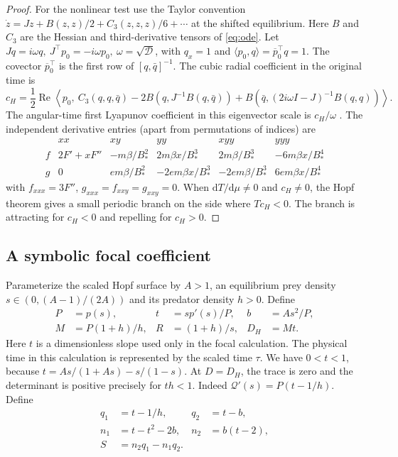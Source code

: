 \documentclass[12pt,a4paper,twoside,fleqn]{article}
\theoremstyle{journal}
\newcommand{\dd}{\mathrm{d}}
\newcommand{\Real}{\operatorname{Re}}
\newcommand{\Q}{\mathcal Q}
\newcommand{\Det}{\mathcal D}
\begin{document}
\begin{proof}
For the nonlinear test use the Taylor convention \(\dot z=Jz+B(z,z)/2+C_3(z,z,z)/6+\cdots\) at the shifted equilibrium. Here \(B\) and \(C_3\) are the Hessian and third-derivative tensors of \eqref{eq:ode}. Let \(Jq=i\omega q,\ J^\top p_0=-i\omega p_0,\ \omega=\sqrt{\Det}\), with \(q_x=1\) and \(\langle p_0,q\rangle=\overline p_0^\top q=1\). The covector \(\overline p_0^\top\) is the first row of \([q,\bar q]^{-1}\). The cubic radial coefficient in the original time is
\begin{equation}\label{eq:lyap}
 c_H=\frac12\Real\left\langle p_0,\
 C_3(q,q,\bar q)-2B(q,J^{-1}B(q,\bar q))
 +B(\bar q,(2i\omega I-J)^{-1}B(q,q))\right\rangle .
\end{equation}
The angular-time first Lyapunov coefficient in this eigenvector scale is \(c_H/\omega\) \citep{kuznetsov98,kuzhopf}. The independent derivative entries (apart from permutations of indices) are
\[
\begin{array}{c|ccccc}
 & xx &xy &yy & xyy & yyy\\ \hline
 f & 2F'+xF'' &-m\beta/B_*^2 &2m\beta x/B_*^3 &2m\beta/B_*^3 &-6m\beta x/B_*^4\\
 g &0 &em\beta/B_*^2 &-2em\beta x/B_*^3 &-2em\beta/B_*^3 &6em\beta x/B_*^4
\end{array}
\]
with \(f_{xxx}=3F''\), \(g_{xxx}=f_{xxy}=g_{xxy}=0\). When \(\dd T/\dd\mu\ne0\) and \(c_H\ne0\), the Hopf theorem gives a small periodic branch on the side where \(T c_H<0\). The branch is attracting for \(c_H<0\) and repelling for \(c_H>0\).

\end{proof}

\subsection{A symbolic focal coefficient}\label{sec:family}
Parameterize the scaled Hopf surface by \(A>1\), an equilibrium prey density \(s\in(0,(A-1)/(2A))\) and its predator density \(h>0\). Define
\begin{equation}\label{eq:shape}
 \begin{aligned}
 P&=p(s), &t&=s p'(s)/P, & b&=A s^2/P,\\
 M&=P(1+h)/h, &R&=(1+h)/s, &D_H&=Mt .
 \end{aligned}
\end{equation}
Here \(t\) is a dimensionless slope used only in the focal calculation. The physical time in this calculation is represented by the scaled time \(\tau\). We have \(0<t<1\), because \(t=As/(1+As)-s/(1-s)\). At \(D=D_H\), the trace is zero and the determinant is positive precisely for \(th<1\). Indeed \(\Q'(s)=P(t-1/h)\). Define
\begin{equation}\label{eq:fcoeff}
 \begin{aligned}
 q_1&=t-1/h, &q_2&=t-b,\\
 n_1&=t-t^2-2b, &n_2&=b(t-2),\\
 S&=n_2q_1-n_1q_2 .
 \end{aligned}
\end{equation}
\end{document}
